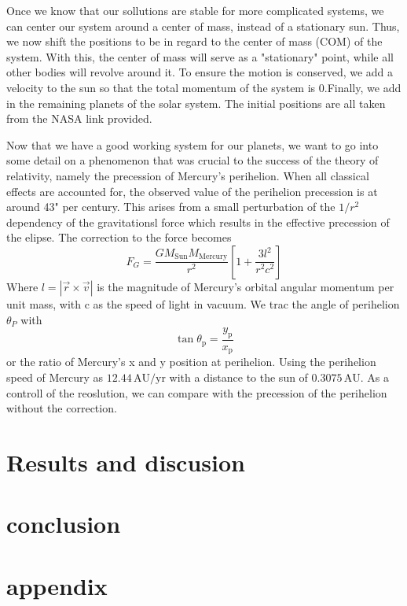 \documentclass[10pt, twocolumn]{revtex4-1}
\begin{document}
Once we know that our sollutions are stable for more complicated systems, we can center our system around a center of mass, instead of a stationary sun.
Thus, we now shift the positions to be in regard to the center of mass (COM) of the system. With this, the center of mass will serve as a "stationary" 
point, while all other bodies will revolve around it. To ensure the motion is conserved, we add a velocity to the sun so that the total momentum of the 
system is 0.Finally, we add in the remaining planets of the solar system. The initial positions are all taken from the NASA link 
provided\cite{NASAPlanetvalues}. 


Now that we have a good working system for our planets, we want to go into some detail on a phenomenon that was crucial to the success of the theory of
relativity, namely the precession of Mercury's perihelion. When all classical effects are accounted for, the observed value of the perihelion precession
is at around 43" per century. This arises from a small perturbation of the $1/r^2$ dependency of the gravitationsl force which results in the effective 
precession of the elipse. The correction to the force becomes 
\[
F_G = \frac{GM_\mathrm{Sun}M_\mathrm{Mercury}}{r^2}\left[1 + \frac{3l^2}{r^2c^2}\right]
\]
Where $l=|\vec{r}\times\vec{v}|$ is the magnitude of Mercury's orbital angular momentum per unit mass, with c as the speed of light in vacuum. We trac the
angle of perihelion $\theta_P$ with 
\[
\tan \theta_\mathrm{p} = \frac{y_\mathrm{p}}{x_\mathrm{p}}
\]
or the ratio of Mercury's x and y position at perihelion. Using the perihelion speed of Mercury as $12.44\,\mathrm{AU}/\mathrm{yr}$ with a distance to the 
sun of $0.3075\,\mathrm{AU}$. As a controll of the reoslution, we can compare with the precession of the perihelion without the correction. 


\section{Results and discusion}

\section{conclusion}

\section{appendix}


\end{document}
